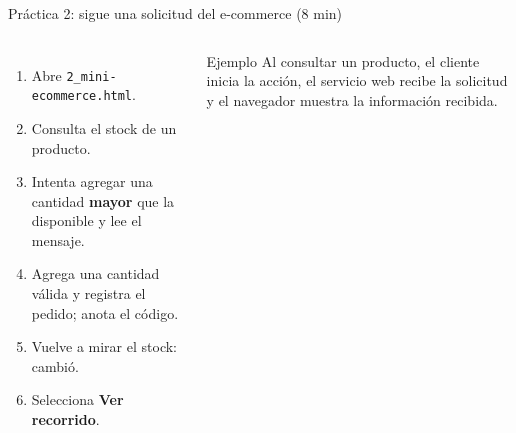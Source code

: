 \documentclass[aspectratio=169,10pt,c]{beamer}
\begin{document}
\begin{frame}{Práctica 2: sigue una solicitud del e-commerce \textnormal{\small(8 min)}}
\begin{columns}[T,onlytextwidth]
\begin{enumerate}\setlength\itemsep{4pt}\small
  \item Abre \texttt{2\_mini-ecommerce.html}.
  \item Consulta el stock de un producto.
  \item Intenta agregar una cantidad \textbf{mayor} que la disponible y lee el mensaje.
  \item Agrega una cantidad válida y registra el pedido; anota el código.
  \item Vuelve a mirar el stock: cambió.
  \item Selecciona \textbf{Ver recorrido}.
\end{enumerate}
\begin{exampleblock}{Ejemplo}
\small Al consultar un producto, el cliente inicia la acción, el servicio web recibe la solicitud y el navegador muestra la información recibida.
\end{exampleblock}
\end{columns}
\end{frame}
\end{document}
